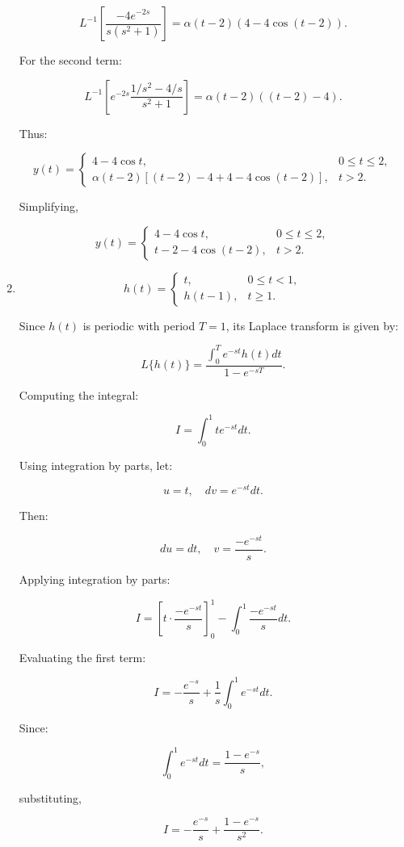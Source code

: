 \documentclass[12pt]{article}
\begin{document}
\begin{enumerate}
\[
L^{-1} \left[ \frac{-4e^{-2s}}{s(s^2+1)} \right] = \alpha(t-2)(4 - 4\cos(t-2)).
\]

For the second term:

\[
L^{-1} \left[ e^{-2s} \frac{1/s^2 - 4/s}{s^2+1} \right] = \alpha(t-2) ((t-2) - 4).
\]

Thus:

\[
y(t) =
\begin{cases} 
4 - 4\cos t, & 0 \leq t \leq 2, \\
\alpha(t-2) \left[ (t-2) - 4 + 4 - 4\cos(t-2) \right], & t > 2.
\end{cases}
\]

Simplifying,

\[
y(t) =
\begin{cases} 
4 - 4\cos t, & 0 \leq t \leq 2, \\
t - 2 - 4\cos(t-2), & t > 2.
\end{cases}
\]

\item 
\[
h(t) =
\begin{cases} 
t, & 0 \leq t < 1, \\
h(t - 1), & t \geq 1.
\end{cases}
\]

Since \( h(t) \) is periodic with period \( T = 1 \), its Laplace transform is given by:

\[
L\{ h(t) \} = \frac{\int_0^T e^{-st} h(t) dt}{1 - e^{-sT}}.
\]

Computing the integral:

\[
I = \int_0^1 t e^{-st} dt.
\]

Using integration by parts, let:

\[
u = t, \quad dv = e^{-st} dt.
\]

Then:

\[
du = dt, \quad v = \frac{-e^{-st}}{s}.
\]

Applying integration by parts:

\[
I = \left[ t \cdot \frac{-e^{-st}}{s} \right]_0^1 - \int_0^1 \frac{-e^{-st}}{s} dt.
\]

Evaluating the first term:

\[
I = -\frac{e^{-s}}{s} + \frac{1}{s} \int_0^1 e^{-st} dt.
\]

Since:

\[
\int_0^1 e^{-st} dt = \frac{1 - e^{-s}}{s},
\]

substituting,

\[
I = -\frac{e^{-s}}{s} + \frac{1 - e^{-s}}{s^2}.
\]


\end{enumerate}
\end{document}
